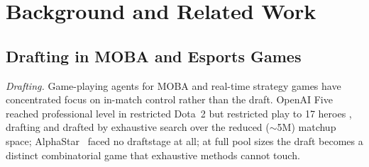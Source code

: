 \documentclass[journal]{IEEEtran}
\providecommand{\DIFaddtex}[1]{{\protect\color{blue} \sf #1}} %
\providecommand{\DIFdeltex}[1]{{\protect\color{red} \scriptsize #1}} %
\providecommand{\DIFaddbegin}{} %
\providecommand{\DIFaddend}{} %
\providecommand{\DIFdelbegin}{} %
\providecommand{\DIFdelend}{} %
\providecommand{\DIFadd}[1]{\texorpdfstring{\DIFaddtex{#1}}{#1}} %
\providecommand{\DIFdel}[1]{\texorpdfstring{\DIFdeltex{#1}}{}} %
\begin{document}
\section{Background and Related Work}

\DIFdelbegin \subsection{\DIFdel{Drafting in MOBA and Esports Games}}
\addtocounter{subsection}{-1}%

\DIFdelend \DIFaddbegin \DIFadd{\textit{Drafting.} }\DIFaddend Game-playing agents for MOBA and real-time strategy games \DIFdelbegin \DIFdel{have concentrated }\DIFdelend \DIFaddbegin \DIFadd{focus }\DIFaddend on in-match control\DIFdelbegin \DIFdel{rather than the draft}\DIFdelend . OpenAI Five~\cite{berner2019dota} \DIFdelbegin \DIFdel{reached professional level in }\DIFdelend \DIFaddbegin \DIFadd{restricted }\DIFaddend Dota~2 \DIFdelbegin \DIFdel{but restricted play }\DIFdelend to 17 heroes \DIFdelbegin \DIFdel{, drafting }\DIFdelend \DIFaddbegin \DIFadd{and drafted }\DIFaddend by exhaustive search\DIFdelbegin \DIFdel{over the reduced ($\sim$5M) matchup space}\DIFdelend ; AlphaStar~\cite{vinyals2019grandmaster} \DIFdelbegin \DIFdel{faced no draftstage at all; at full pool sizes the draft becomes a distinct combinatorial game that exhaustive methods cannot touch. }%
\end{document}
